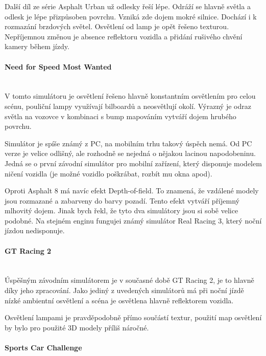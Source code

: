 \documentclass[11pt,twoside,a4paper]{book}
\begin{document}
Další díl ze série Asphalt Urban už odlesky řeší lépe. Odráží se hlavně světla a odlesk je lépe přizpůsoben povrchu. Vzniká zde dojem mokré silnice. Dochází i k rozmazání brzdových světel. Osvětlení od lamp je opět řešeno texturou. Nepříjemnou změnou je absence reflektoru vozidla a přidání rušivého chvění kamery během jízdy.

\paragraph{Need for Speed Most Wanted}\mbox{}\\

V tomto simulátoru je osvětlení řešeno hlavně konstantním osvětlením pro celou scénu, pouliční lampy využívají bilboardů a neosvětlují okolí. Výrazný je odraz světla na vozovce v kombinaci s bump mapováním vytváří dojem hrubého povrchu.

Simulátor je spíše známý z PC, na mobilním trhu takový úspěch nemá. Od PC verze je velice odlišný, ale rozhodně se nejedná o nějakou lacinou napodobeninu. Jedná se o první závodní simulátor pro mobilní zařízení, který disponuje modelem ničení vozidla (je možné vozidlo poškrábat, rozbít mu okna apod).

Oproti Asphalt 8 má navíc efekt Depth-of-field. To znamená, že vzdálené modely jsou rozmazané a zabarveny do barvy pozadí. Tento efekt vytváří příjemný mlhovitý dojem. Jinak bych řekl, že tyto dva simulátory jsou si sobě velice podobné. Na stejném enginu funguje\linebreak i známý simulátor Real Racing 3, který noční jízdou nedisponuje.

\paragraph{GT Racing 2}\mbox{}\\

Úspěšným závodním simulátorem je v současné době GT Racing 2, je to hlavně díky jeho zpracování. Jako jediný z uvedených simulátorů má při noční jízdě nízké ambientní osvětlení a scéna je osvětlena hlavně reflektorem vozidla.

Osvětlení lampami je pravděpodobně přímo součástí textur, použití map osvětlení by bylo pro použité 3D modely příliš náročné.

\paragraph{Sports Car Challenge}\mbox{}\\
\end{document}
